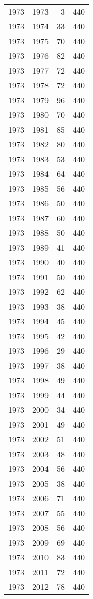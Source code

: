 \documentclass[
  10pt,
  letterpaper,
  DIV=11,
  numbers=noendperiod,
  twoside]{scrartcl}
\begin{document}
\begin{longtable}[]{@{}rrrr@{}}
1973 & 1973 & 3 & 440 \\
1973 & 1974 & 33 & 440 \\
1973 & 1975 & 70 & 440 \\
1973 & 1976 & 82 & 440 \\
1973 & 1977 & 72 & 440 \\
1973 & 1978 & 72 & 440 \\
1973 & 1979 & 96 & 440 \\
1973 & 1980 & 70 & 440 \\
1973 & 1981 & 85 & 440 \\
1973 & 1982 & 80 & 440 \\
1973 & 1983 & 53 & 440 \\
1973 & 1984 & 64 & 440 \\
1973 & 1985 & 56 & 440 \\
1973 & 1986 & 50 & 440 \\
1973 & 1987 & 60 & 440 \\
1973 & 1988 & 50 & 440 \\
1973 & 1989 & 41 & 440 \\
1973 & 1990 & 40 & 440 \\
1973 & 1991 & 50 & 440 \\
1973 & 1992 & 62 & 440 \\
1973 & 1993 & 38 & 440 \\
1973 & 1994 & 45 & 440 \\
1973 & 1995 & 42 & 440 \\
1973 & 1996 & 29 & 440 \\
1973 & 1997 & 38 & 440 \\
1973 & 1998 & 49 & 440 \\
1973 & 1999 & 44 & 440 \\
1973 & 2000 & 34 & 440 \\
1973 & 2001 & 49 & 440 \\
1973 & 2002 & 51 & 440 \\
1973 & 2003 & 48 & 440 \\
1973 & 2004 & 56 & 440 \\
1973 & 2005 & 38 & 440 \\
1973 & 2006 & 71 & 440 \\
1973 & 2007 & 55 & 440 \\
1973 & 2008 & 56 & 440 \\
1973 & 2009 & 69 & 440 \\
1973 & 2010 & 83 & 440 \\
1973 & 2011 & 72 & 440 \\
1973 & 2012 & 78 & 440 \\

\end{longtable}
\end{document}
